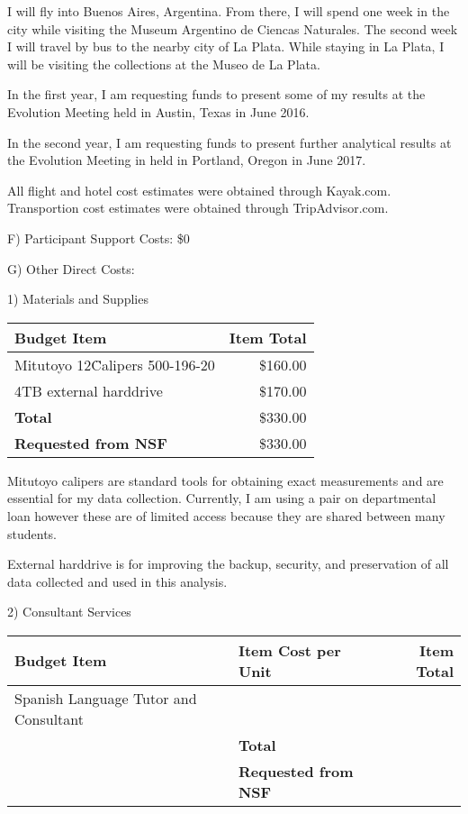 \documentclass[11pt,letterpaper]{article}
\begin{document}
I will fly into Buenos Aires, Argentina. From there, I will spend one week in the city while visiting the Museum Argentino de Ciencas Naturales. The second week I will travel by bus to the nearby city of La Plata. While staying in La Plata, I will be visiting the collections at the Museo de La Plata. 

In the first year, I am requesting funds to present some of my results at the Evolution Meeting held in Austin, Texas in June 2016.

In the second year, I am requesting funds to present further analytical results at the Evolution Meeting in held in Portland, Oregon in June 2017.

All flight and hotel cost estimates were obtained through Kayak.com. Transportion cost estimates were obtained through TripAdvisor.com.


F) Participant Support Costs: \$0

G) Other Direct Costs:

1) Materials and Supplies

\begin{tabular}[H]{l r}
  Budget Item & Item Total \\
  \hline
  Mitutoyo 12\" Calipers 500-196-20 & \$160.00 \\
  4TB external harddrive & \$170.00 \\
  \textbf{Total} & \$330.00 \\
  \textbf{Requested from NSF} & \$330.00
\end{tabular}

Mitutoyo calipers are standard tools for obtaining exact measurements and are essential for my data collection. Currently, I am using a pair on departmental loan however these are of limited access because they are shared between many students. 

External harddrive is for improving the backup, security, and preservation of all data collected and used in this analysis.




2) Consultant Services

\begin{tabular}[H]{l l r}
  Budget Item & Item Cost per Unit & Item Total \\
  \hline
  Spanish Language Tutor and Consultant & \\
  & \textbf{Total} & \\
  & \textbf{Requested from NSF} & 
\end{tabular}
\end{document}
